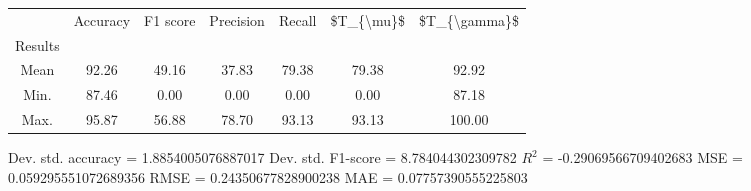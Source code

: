 \begin{tabular}{|c|c|c|c|c|c|c|}
\toprule
{} &  Accuracy &  F1 score &  Precision &  Recall &  \$T\_\{\textbackslash mu\}\$ &  \$T\_\{\textbackslash gamma\}\$ \\
Results &           &           &            &         &            &               \\
\hline
Mean    &     92.26 &     49.16 &      37.83 &   79.38 &      79.38 &         92.92 \\
Min.    &     87.46 &      0.00 &       0.00 &    0.00 &       0.00 &         87.18 \\
Max.    &     95.87 &     56.88 &      78.70 &   93.13 &      93.13 &        100.00 \\
\bottomrule
\end{tabular}

 Dev. std. accuracy = 1.8854005076887017
 Dev. std. F1-score = 8.784044302309782
 $R^2$ = -0.29069566709402683
 MSE = 0.059295551072689356
 RMSE = 0.24350677828900238
 MAE = 0.07757390555225803